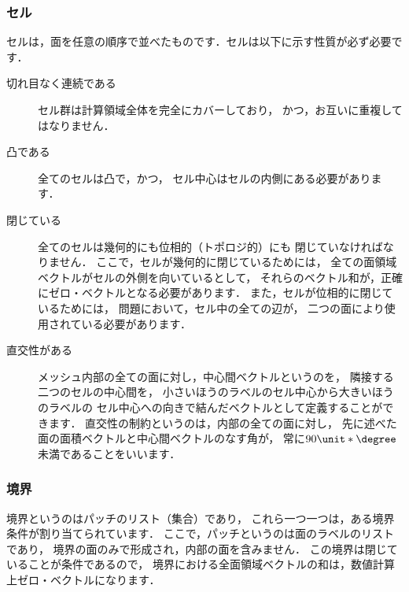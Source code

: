 \subsubsection{セル}
\label{sssec:5.1.1.3}
セルは，面を任意の順序で並べたものです．セルは以下に示す性質が必ず必要です．
\begin{description}
 \item[切れ目なく連続である]
            セル群は計算領域全体を完全にカバーしており，
            かつ，お互いに重複してはなりません．
 \item[凸である]
            全てのセルは凸で，かつ，
            セル中心はセルの内側にある必要があります．
 \item[閉じている]
            全てのセルは幾何的にも位相的（トポロジ的）にも
            閉じていなければなりません．
            ここで，セルが幾何的に閉じているためには，
            全ての面領域ベクトルがセルの外側を向いているとして，
            それらのベクトル和が，正確にゼロ・ベクトルとなる必要があります．
            また，セルが位相的に閉じているためには，
            問題において，セル中の全ての辺が，
            二つの面により使用されている必要があります．
 \item[直交性がある]
            メッシュ内部の全ての面に対し，中心間ベクトルというのを，
            隣接する二つのセルの中心間を，
            小さいほうのラベルのセル中心から大きいほうのラベルの
            セル中心への向きで結んだベクトルとして定義することができます．
            直交性の制約というのは，内部の全ての面に対し，
            先に述べた面の面積ベクトルと中心間ベクトルのなす角が，
            常に$90\unit*{\degree}$未満であることをいいます．
\end{description}

\subsubsection{境界}
\label{sssec:5.1.1.4}
境界というのはパッチのリスト（集合）であり，
これら一つ一つは，ある境界条件が割り当てられています．
ここで，パッチというのは面のラベルのリストであり，
境界の面のみで形成され，内部の面を含みません．
この境界は閉じていることが条件であるので，
境界における全面領域ベクトルの和は，数値計算上ゼロ・ベクトルになります．


